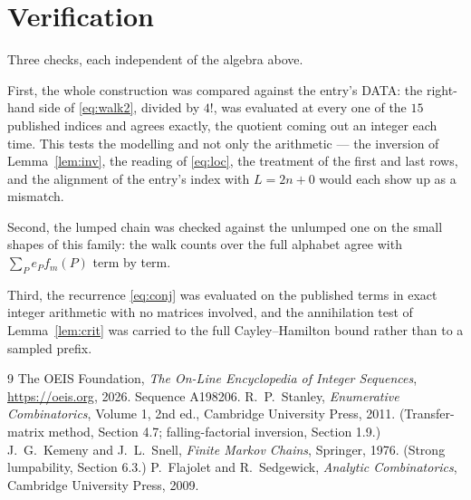 \documentclass[11pt,a4paper]{article}
\theoremstyle{plain}
\theoremstyle{definition}
\begin{document}
\section{Verification}

Three checks, each independent of the algebra above.

First, the whole construction was compared against the entry's DATA: the right-hand side of
\eqref{eq:walk2}, divided by $4!$, was evaluated at every one of the $15$
published indices and agrees exactly, the quotient coming out an integer each time. This
tests the modelling and not only the arithmetic --- the inversion of Lemma~\ref{lem:inv},
the reading of \eqref{eq:loc}, the treatment of the first and last rows, and the
alignment of the entry's index with $L=2n+0$ would each show up as a mismatch.

Second, the lumped chain was checked against the unlumped one on the small shapes of this
family: the walk counts over the full alphabet agree with $\sum_P e_Pf_m(P)$ term by term.

Third, the recurrence \eqref{eq:conj} was evaluated on the published terms in exact integer
arithmetic with no matrices involved, and the annihilation test of Lemma~\ref{lem:crit} was
carried to the full Cayley--Hamilton bound rather than to a sampled prefix.

\begin{thebibliography}{9}
 The OEIS Foundation, \emph{The On-Line Encyclopedia of Integer
Sequences}, \url{https://oeis.org}, 2026. Sequence A198206.
 R.~P.~Stanley, \emph{Enumerative Combinatorics}, Volume 1, 2nd ed.,
Cambridge University Press, 2011. (Transfer-matrix method, Section 4.7; falling-factorial
inversion, Section 1.9.)
 J.~G.~Kemeny and J.~L.~Snell, \emph{Finite Markov Chains}, Springer,
1976. (Strong lumpability, Section 6.3.)
 P.~Flajolet and R.~Sedgewick, \emph{Analytic Combinatorics}, Cambridge
University Press, 2009.
\end{thebibliography}
\end{document}
